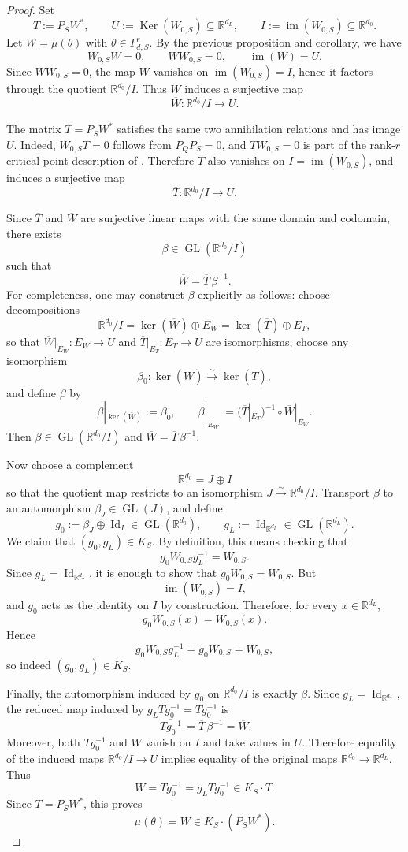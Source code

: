 \documentclass[11pt]{article}
\newcommand{\id}{\operatorname{Id}}
\newcommand{\im}{\operatorname{im}}
\newcommand{\Ker}{\operatorname{Ker}}
\newcommand{\GL}{\operatorname{GL}}
\newcommand{\R}{\mathbb{R}}
\theoremstyle{definition}
\begin{document}
\begin{proof}
Set
\[
T:=P_SW^\ast,
\qquad
U:=\Ker(W_{0,S})\subseteq \R^{d_L},
\qquad
I:=\im(W_{0,S})\subseteq \R^{d_0}.
\]
Let \(W=\mu(\theta)\) with \(\theta\in \Gamma_{d,S}^r\). By the previous proposition
and corollary, we have
\[
W_{0,S}W=0,
\qquad
WW_{0,S}=0,
\qquad
\im(W)=U.
\]
Since \(WW_{0,S}=0\), the map \(W\) vanishes on \(\im(W_{0,S})=I\), hence it factors
through the quotient \(\R^{d_0}/I\). Thus \(W\) induces a surjective map
\[
\overline W:\R^{d_0}/I\to U.
\]

The matrix \(T=P_SW^\ast\) satisfies the same two annihilation
relations and has image \(U\). Indeed, \(W_{0,S}T=0\) follows from \(P_QP_S=0\), and
\(TW_{0,S}=0\) is part of the rank-\(r\) critical-point description of
\cite{achour2024loss}. Therefore \(T\) also vanishes on \(I=\im(W_{0,S})\), and
induces a surjective map
\[
\overline T:\R^{d_0}/I\to U.
\]

Since \(\overline T\) and \(\overline W\) are surjective linear maps with the same
domain and codomain, there exists
\[
\beta\in \GL(\R^{d_0}/I)
\]
such that
\[
\overline W=\overline T\,\beta^{-1}.
\]
For completeness, one may construct \(\beta\) explicitly as follows: choose
decompositions
\[
\R^{d_0}/I=\ker(\overline W)\oplus E_W
=\ker(\overline T)\oplus E_T,
\]
so that \(\overline W|_{E_W}:E_W\to U\) and \(\overline T|_{E_T}:E_T\to U\) are
isomorphisms, choose any isomorphism
\[
\beta_0:\ker(\overline W)\xrightarrow{\sim}\ker(\overline T),
\]
and define \(\beta\) by
\[
\beta|_{\ker(\overline W)}:=\beta_0,
\qquad
\beta|_{E_W}:=
\bigl(\overline T|_{E_T}\bigr)^{-1}\circ \overline W|_{E_W}.
\]
Then \(\beta\in \GL(\R^{d_0}/I)\) and \(\overline W=\overline T\,\beta^{-1}\).

Now choose a complement
\[
\R^{d_0}=J\oplus I
\]
so that the quotient map restricts to an isomorphism \(J\xrightarrow{\sim}\R^{d_0}/I\).
Transport \(\beta\) to an automorphism \(\beta_J\in \GL(J)\), and define
\[
g_0:=\beta_J\oplus \id_I\in \GL(\R^{d_0}),
\qquad
g_L:=\id_{\R^{d_L}}\in \GL(\R^{d_L}).
\]
We claim that \((g_0,g_L)\in K_S\). By definition, this means checking that
\[
g_0W_{0,S}g_L^{-1}=W_{0,S}.
\]
Since \(g_L=\id_{\R^{d_L}}\), it is enough to show that \(g_0W_{0,S}=W_{0,S}\).
But
\[
\im(W_{0,S})=I,
\]
and \(g_0\) acts as the identity on \(I\) by construction. Therefore, for every
\(x\in \R^{d_L}\),
\[
g_0W_{0,S}(x)=W_{0,S}(x).
\]
Hence
\[
g_0W_{0,S}g_L^{-1}=g_0W_{0,S}=W_{0,S},
\]
so indeed \((g_0,g_L)\in K_S\).

Finally, the automorphism induced by \(g_0\) on \(\R^{d_0}/I\) is exactly \(\beta\).
Since \(g_L=\id_{\R^{d_L}}\), the reduced map induced by \(g_LTg_0^{-1}=Tg_0^{-1}\)
is
\[
\overline{\,Tg_0^{-1}\,}
=
\overline T\,\beta^{-1}
=
\overline W.
\]
Moreover, both \(Tg_0^{-1}\) and \(W\) vanish on \(I\) and take values in \(U\).
Therefore equality of the induced maps \(\R^{d_0}/I\to U\) implies equality of the
original maps \(\R^{d_0}\to \R^{d_L}\). Thus
\[
W=Tg_0^{-1}=g_LTg_0^{-1}\in K_S\cdot T.
\]
Since \(T=P_SW^\ast\), this proves
\[
\mu(\theta)=W\in K_S\cdot (P_SW^\ast).
\]
\end{proof}
\end{document}
